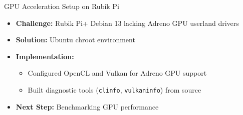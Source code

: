 \begin{frame}{GPU Acceleration Setup on Rubik Pi}
   \begin{itemize}
       \item \textbf{Challenge:} Rubik Pi+ Debian 13 lacking Adreno GPU userland drivers
       \item \textbf{Solution:} Ubuntu chroot environment 
       \item \textbf{Implementation:}
           \begin{itemize}
               \item Configured OpenCL and Vulkan for Adreno GPU support
               \item Built diagnostic tools (\texttt{clinfo}, \texttt{vulkaninfo}) from source
           \end{itemize}
       \item \textbf{Next Step:} Benchmarking GPU performance
   \end{itemize}
\end{frame}

